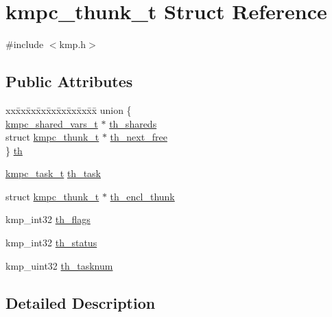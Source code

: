 \hypertarget{structkmpc__thunk__t}{\section{kmpc\-\_\-thunk\-\_\-t Struct Reference}
\label{structkmpc__thunk__t}
}


{\ttfamily \#include $<$kmp.\-h$>$}

\subsection*{Public Attributes}
\begin{DoxyCompactItemize}
\item 
\begin{tabbing}
xx\=xx\=xx\=xx\=xx\=xx\=xx\=xx\=xx\=\kill
union \{\\
\>\hyperlink{structkmpc__shared__vars__t}{kmpc\_shared\_vars\_t} $\ast$ \hyperlink{structkmpc__thunk__t_a481b82a1c9aeb8d9141a04e5d1895147}{th\_shareds}\\
\>struct \hyperlink{structkmpc__thunk__t}{kmpc\_thunk\_t} $\ast$ \hyperlink{structkmpc__thunk__t_a8afc990c7593d8046a2f07a2578281db}{th\_next\_free}\\
\} \hyperlink{structkmpc__thunk__t_a9e3c1d0245bed556c044849352192f7f}{th}\\

\end{tabbing}\item 
\hyperlink{kmp_8h_a443fb9b6063601b5a564b4562a836fcf}{kmpc\-\_\-task\-\_\-t} \hyperlink{structkmpc__thunk__t_a3bf681925c3209e5fa5d9a6059d4f8e1}{th\-\_\-task}
\item 
struct \hyperlink{structkmpc__thunk__t}{kmpc\-\_\-thunk\-\_\-t} $\ast$ \hyperlink{structkmpc__thunk__t_a1aeaa8d80dfb3e836624ae5ad492036d}{th\-\_\-encl\-\_\-thunk}
\item 
kmp\-\_\-int32 \hyperlink{structkmpc__thunk__t_a9a36ce89c9dde209b70735a253164a98}{th\-\_\-flags}
\item 
kmp\-\_\-int32 \hyperlink{structkmpc__thunk__t_a6e987faf085a9ed1272495eea346c483}{th\-\_\-status}
\item 
kmp\-\_\-uint32 \hyperlink{structkmpc__thunk__t_ae634cea43cfdc789c6cd8c3fafa394ea}{th\-\_\-tasknum}
\end{DoxyCompactItemize}


\subsection{Detailed Description}


